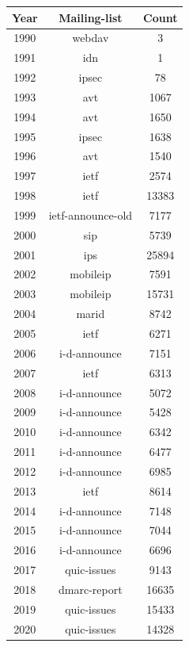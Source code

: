 \documentclass[a4paper,english]{report}
\begin{document}
\begin{center}
 \begin{tabular}{|c | c | c|}
 \hline
 Year & Mailing-list & Count \\ [0.5ex]
 \hline\hline
1990 & webdav & 3\\
\hline
1991 & idn & 1\\
\hline
1992 & ipsec & 78\\
\hline
1993 & avt & 1067\\
\hline
1994 & avt & 1650\\
\hline
1995 & ipsec & 1638\\
\hline
1996 & avt & 1540\\
\hline
1997 & ietf & 2574\\
\hline
1998 & ietf & 13383\\
\hline
1999 & ietf-announce-old & 7177\\
\hline
2000 & sip & 5739\\
\hline
2001 & ips & 25894\\
\hline
2002 & mobileip & 7591\\
\hline
2003 & mobileip & 15731\\
\hline
2004 & marid & 8742\\
\hline
2005 & ietf & 6271\\
\hline
2006 & i-d-announce & 7151\\
\hline
2007 & ietf & 6313\\
\hline
2008 & i-d-announce & 5072\\
\hline
2009 & i-d-announce & 5428\\
\hline
2010 & i-d-announce & 6342\\
\hline
2011 & i-d-announce & 6477\\
\hline
2012 & i-d-announce & 6985\\
\hline
2013 & ietf & 8614\\
\hline
2014 & i-d-announce & 7148\\
\hline
2015 & i-d-announce & 7044\\
\hline
2016 & i-d-announce & 6696\\
\hline
2017 & quic-issues & 9143\\
\hline
2018 & dmarc-report & 16635\\
\hline
2019 & quic-issues & 15433\\
\hline
2020 & quic-issues & 14328\\
\hline
\end{tabular}

\end{center}
\end{document}
